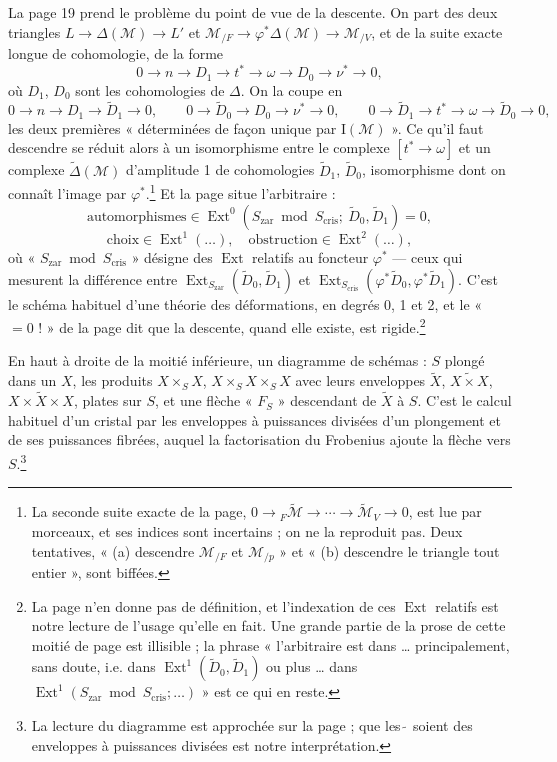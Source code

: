 \documentclass[11pt,a4paper]{article}
\begin{document}
La page 19 prend le problème du point de vue de la descente. On part des deux
triangles $L \to \Delta(\mathcal{M}) \to L'$ et
$\mathcal{M}_{/F} \to \varphi^{*}\Delta(\mathcal{M}) \to \mathcal{M}_{/V}$,
et de la suite exacte longue de cohomologie, de la forme
\[
0 \to n \to D_{1} \to t^{*} \to \omega \to D_{0} \to \nu^{*} \to 0,
\]
où $D_{1}$, $D_{0}$ sont les cohomologies de $\Delta$. On la coupe en
\[
0 \to n \to D_{1} \to \tilde D_{1} \to 0, \qquad
0 \to \tilde D_{0} \to D_{0} \to \nu^{*} \to 0, \qquad
0 \to \tilde D_{1} \to t^{*} \to \omega \to \tilde D_{0} \to 0,
\]
les deux premières « déterminées de façon unique par $\mathrm{I}(\mathcal{M})$ ».
Ce qu'il faut descendre se réduit alors à un isomorphisme entre le complexe
$[t^{*} \to \omega]$ et un complexe $\tilde\Delta(\mathcal{M})$ d'amplitude 1
de cohomologies $\tilde D_{1}$, $\tilde D_{0}$, isomorphisme dont on connaît
l'image par $\varphi^{*}$.\footnote{La seconde suite exacte de la page,
$0 \to {}_{F}\tilde{\mathcal{M}} \to \cdots \to \tilde{\mathcal{M}}_{V} \to 0$,
est lue par morceaux, et ses indices sont incertains ; on ne la reproduit
pas. Deux tentatives, « (a) descendre $\mathcal{M}_{/F}$ et
$\mathcal{M}_{/p}$ » et « (b) descendre le triangle tout entier », sont
biffées.} Et la page situe l'arbitraire :
\[
\text{automorphismes} \in \operatorname{Ext}^{0}(S_{\mathrm{zar}} \bmod
S_{\mathrm{cris}};\ \tilde D_{0}, \tilde D_{1}) = 0,
\]
\[
\text{choix} \in \operatorname{Ext}^{1}(\ldots), \quad
\text{obstruction} \in \operatorname{Ext}^{2}(\ldots),
\]
où « $S_{\mathrm{zar}} \bmod S_{\mathrm{cris}}$ » désigne des $\operatorname{Ext}$
relatifs au foncteur $\varphi^{*}$ — ceux qui mesurent la différence entre
$\operatorname{Ext}_{S_{\mathrm{zar}}}(\tilde D_{0}, \tilde D_{1})$ et
$\operatorname{Ext}_{S_{\mathrm{cris}}}(\varphi^{*}\tilde D_{0},
\varphi^{*}\tilde D_{1})$. C'est le schéma habituel d'une théorie des
déformations, en degrés 0, 1 et 2, et le « $= 0$ ! » de la page dit que la
descente, quand elle existe, est rigide.\footnote{La page n'en donne pas de
définition, et l'indexation de ces $\operatorname{Ext}$ relatifs est notre
lecture de l'usage qu'elle en fait. Une grande partie de la prose de cette
moitié de page est illisible ; la phrase « l'arbitraire est dans \ldots{}
principalement, sans doute, i.e. dans $\operatorname{Ext}^{1}(\tilde D_{0},
\tilde D_{1})$ ou plus \ldots{} dans $\operatorname{Ext}^{1}(S_{\mathrm{zar}}
\bmod S_{\mathrm{cris}}; \ldots)$ » est ce qui en reste.}

En haut à droite de la moitié inférieure, un diagramme de schémas : $S$
plongé dans un $X$, les produits $X \times_{S} X$, $X \times_{S} X \times_{S}
X$ avec leurs enveloppes $\tilde X$, $\widetilde{X \times X}$,
$\widetilde{X \times X \times X}$, plates sur $S$, et une flèche « $F_{S}$ »
descendant de $\tilde X$ à $S$. C'est le calcul habituel d'un cristal par les
enveloppes à puissances divisées d'un plongement et de ses puissances
fibrées, auquel la factorisation du Frobenius ajoute la flèche vers
$S$.\footnote{La lecture du diagramme est approchée sur la page ; que les
$\tilde{\ }$ soient des enveloppes à puissances divisées est notre
interprétation.}
\end{document}

